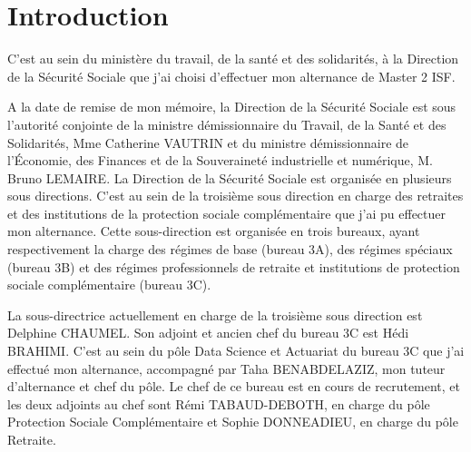 \chapter*{Introduction} %


C'est au sein du ministère  du travail, de la santé et des solidarités, à la Direction de la Sécurité Sociale que j'ai choisi d'effectuer mon alternance de Master 2 ISF.

A la date de remise de mon mémoire, la Direction de la Sécurité Sociale est sous l’autorité conjointe de la ministre démissionnaire du Travail, de la Santé et des Solidarités, Mme Catherine VAUTRIN et du ministre démissionnaire de l’Économie, des Finances et de la Souveraineté industrielle et numérique, M. Bruno LEMAIRE. 
La Direction de la Sécurité Sociale est organisée en plusieurs sous directions. C’est au sein de la troisième sous direction en charge des retraites et des institutions de la protection sociale complémentaire que j’ai pu effectuer mon alternance. Cette sous-direction est organisée en trois bureaux, ayant respectivement la charge des régimes de base (bureau 3A), des régimes spéciaux (bureau 3B) et des régimes professionnels de retraite et institutions de protection sociale complémentaire (bureau 3C).

La sous-directrice actuellement en charge de la troisième sous direction est Delphine CHAUMEL. Son adjoint et ancien chef du bureau 3C est Hédi BRAHIMI.
C’est au sein du pôle Data Science et Actuariat du bureau 3C que j’ai effectué mon alternance, accompagné par Taha BENABDELAZIZ, mon tuteur d'alternance et chef du pôle.
Le chef de ce bureau est en cours de recrutement, et les deux adjoints au chef sont Rémi TABAUD-DEBOTH, en charge du pôle Protection Sociale Complémentaire et Sophie DONNEADIEU, en charge du pôle Retraite. 


